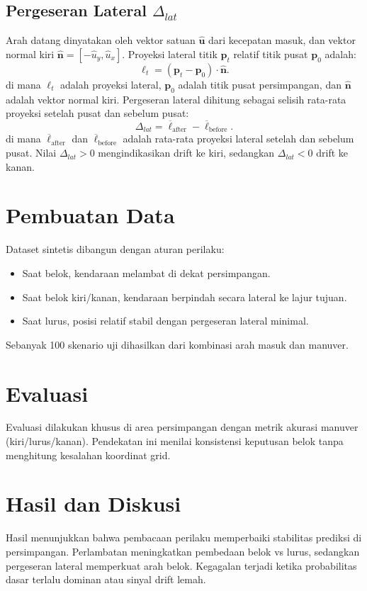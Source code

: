 \documentclass[conference]{IEEEtran}
\begin{document}
\subsection{Pergeseran Lateral $\Delta_{lat}$}
Arah datang dinyatakan oleh vektor satuan $\hat{\mathbf{u}}$ dari kecepatan masuk, dan vektor normal kiri $\hat{\mathbf{n}}=[-\hat{u}_y,\hat{u}_x]$. Proyeksi lateral titik $\mathbf{p}_t$ relatif titik pusat $\mathbf{p}_0$ adalah:
\begin{equation}
\ell_t = (\mathbf{p}_t-\mathbf{p}_0)\cdot \hat{\mathbf{n}}.
\end{equation}
di mana $\ell_t$ adalah proyeksi lateral, $\mathbf{p}_0$ adalah titik pusat persimpangan, dan $\hat{\mathbf{n}}$ adalah vektor normal kiri.
Pergeseran lateral dihitung sebagai selisih rata-rata proyeksi setelah pusat dan sebelum pusat:
\begin{equation}
\Delta_{lat}=\overline{\ell}_{\text{after}}-\overline{\ell}_{\text{before}}.
\end{equation}
di mana $\overline{\ell}_{\text{after}}$ dan $\overline{\ell}_{\text{before}}$ adalah rata-rata proyeksi lateral setelah dan sebelum pusat.
Nilai $\Delta_{lat}>0$ mengindikasikan drift ke kiri, sedangkan $\Delta_{lat}<0$ drift ke kanan.

\section{Pembuatan Data}
Dataset sintetis dibangun dengan aturan perilaku:
\begin{itemize}
\item Saat belok, kendaraan melambat di dekat persimpangan.
\item Saat belok kiri/kanan, kendaraan berpindah secara lateral ke lajur tujuan.
\item Saat lurus, posisi relatif stabil dengan pergeseran lateral minimal.
\end{itemize}
Sebanyak 100 skenario uji dihasilkan dari kombinasi arah masuk dan manuver.

\section{Evaluasi}
Evaluasi dilakukan khusus di area persimpangan dengan metrik akurasi manuver (kiri/lurus/kanan). Pendekatan ini menilai konsistensi keputusan belok tanpa menghitung kesalahan koordinat grid.

\section{Hasil dan Diskusi}
Hasil menunjukkan bahwa pembacaan perilaku memperbaiki stabilitas prediksi di persimpangan. Perlambatan meningkatkan pembedaan belok vs lurus, sedangkan pergeseran lateral memperkuat arah belok. Kegagalan terjadi ketika probabilitas dasar terlalu dominan atau sinyal drift lemah.
\end{document}
